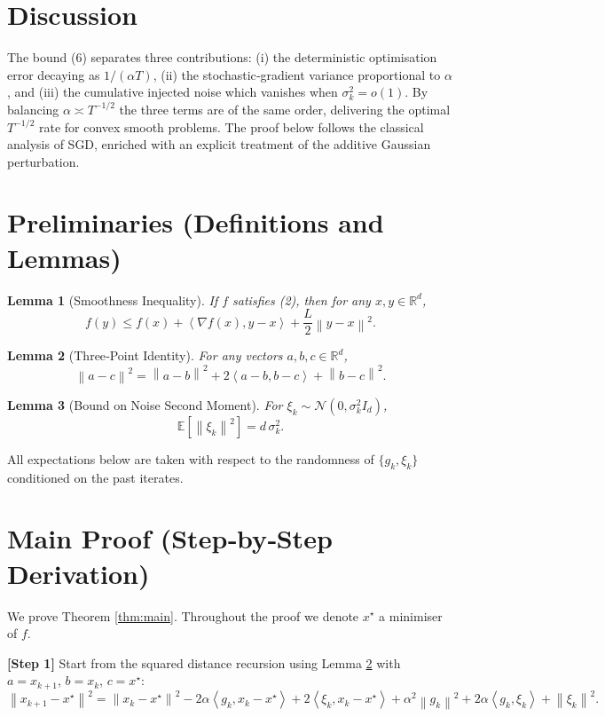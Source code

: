 \documentclass[11pt]{article}
\newtheorem{lemma}{Lemma}
\newcommand{\E}{\mathbb{E}}
\newcommand{\R}{\mathbb{R}}
\newcommand{\norm}[1]{\left\|#1\right\|}
\newcommand{\iprod}[2]{\left\langle #1,#2\right\rangle}
\begin{document}
\section*{Discussion}
The bound (6) separates three contributions: (i) the deterministic optimisation error decaying as $1/(\alpha T)$, (ii) the stochastic‑gradient variance proportional to $\alpha$, and (iii) the cumulative injected noise which vanishes when $\sigma_{k}^{2}=o(1)$. By balancing $\alpha\asymp T^{-1/2}$ the three terms are of the same order, delivering the optimal $T^{-1/2}$ rate for convex smooth problems. The proof below follows the classical analysis of SGD, enriched with an explicit treatment of the additive Gaussian perturbation.

\section*{Preliminaries (Definitions and Lemmas)}
\begin{lemma}[Smoothness Inequality]\label{lem:smooth}
If $f$ satisfies (2), then for any $x,y\in\R^{d}$,
\[
f(y)\le f(x)+\iprod{\nabla f(x)}{y-x}+\frac{L}{2}\norm{y-x}^{2}.
\tag{8}
\]
\end{lemma}
\begin{lemma}[Three‑Point Identity]\label{lem:3pt}
For any vectors $a,b,c\in\R^{d}$,
\[
\norm{a-c}^{2}= \norm{a-b}^{2}+2\iprod{a-b}{b-c}+\norm{b-c}^{2}.
\tag{9}
\]
\end{lemma}
\begin{lemma}[Bound on Noise Second Moment]\label{lem:noise}
For $\xi_{k}\sim\mathcal N(0,\sigma_{k}^{2}I_{d})$,
\[
\E\!\left[\norm{\xi_{k}}^{2}\right]=d\,\sigma_{k}^{2}.
\tag{10}
\]
\end{lemma}
All expectations below are taken with respect to the randomness of $\{g_{k},\xi_{k}\}$ conditioned on the past iterates.

\section*{Main Proof (Step‑by‑Step Derivation)}
We prove Theorem \ref{thm:main}.  Throughout the proof we denote $x^{\star}$ a minimiser of $f$.

\bigskip
\noindent\textbf{[Step 1]}  Start from the squared distance recursion using Lemma \ref{lem:3pt} with $a=x_{k+1}$, $b=x_{k}$, $c=x^{\star}$:
\[
\norm{x_{k+1}-x^{\star}}^{2}= \norm{x_{k}-x^{\star}}^{2}
-2\alpha\iprod{g_{k}}{x_{k}-x^{\star}}
+2\iprod{\xi_{k}}{x_{k}-x^{\star}}
+\alpha^{2}\norm{g_{k}}^{2}
+2\alpha\iprod{g_{k}}{\xi_{k}}
+\norm{\xi_{k}}^{2}.
\tag{11}
\]
\end{document}
